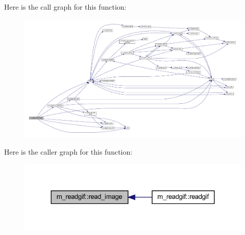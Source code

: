Here is the call graph for this function\+:
\nopagebreak
\begin{figure}[H]
\begin{center}
\leavevmode
\includegraphics[width=350pt]{namespacem__readgif_a4af978d944dbefb3ddeb81cd8c54d0f9_cgraph}
\end{center}
\end{figure}
Here is the caller graph for this function\+:
\nopagebreak
\begin{figure}[H]
\begin{center}
\leavevmode
\includegraphics[width=324pt]{namespacem__readgif_a4af978d944dbefb3ddeb81cd8c54d0f9_icgraph}
\end{center}
\end{figure}
\mbox{\label{namespacem__readgif_a775e2da2a9f54ec308e87a339a393ed6}} 
